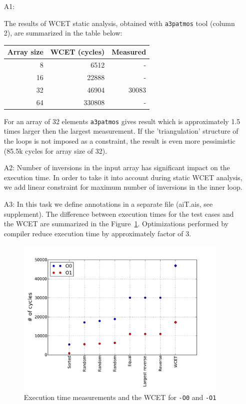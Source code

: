 \documentclass[12pt,a4paper,titlepage,oneside]{article}
\begin{document}
\begin{itemize}

\item[A1:]

The results of WCET static analysis, obtained with \texttt{a3patmos}
tool (column 2), are summarized in the table below:

\begin{tabular}{ | r | r | r |}
\hline
Array size & WCET (cycles) & Measured \\\hline
8  & 6512 & - \\\hline
16 & 22888 & - \\\hline
32 & 46904 & 30083 \\\hline
64 & 330808 & - \\\hline
\end{tabular}

For an array of 32 elements \texttt{a3patmos} gives result which is
approximately 1.5 times larger then the largest measurement. 
If the 'triangulation' structure of the loops is not
imposed as a constraint, the result is even more
pessimistic (85.5k cycles for array size of 32).

\item[A2:]
Number of inversions in the input array has significant impact on
the execution time. In order to take it into
account during static WCET analysis, we add linear
constraint for maximum number of inversions in the inner loop.

\item[A3:]
In this task we define annotations in a separate file (aiT.ais, see
supplement).
The difference between execution times for the test cases 
and the WCET are summarized in the Figure~\ref{fig:opt_compare}.
Optimizations performed by compiler  reduce execution
time by approximately factor of 3.

\begin{figure}[hb!]
  \centering
  \includegraphics[width=4in]{q2_3}
  \caption
  {Execution time measurements and the WCET for \texttt{-O0} and
  \texttt{-O1}}
	\label{fig:opt_compare}
\end{figure}



\end{itemize}
\end{document}
